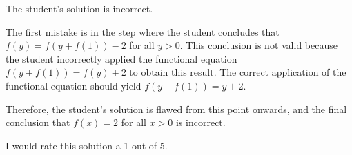 The student's solution is incorrect.

The first mistake is in the step where the student concludes that $f(y) = f(y+f(1))-2$ for all $y>0$. This conclusion is not valid because the student incorrectly applied the functional equation $f(y+f(1)) = f(y) + 2$ to obtain this result. The correct application of the functional equation should yield $f(y+f(1)) = y + 2$.

Therefore, the student's solution is flawed from this point onwards, and the final conclusion that $f(x) = 2$ for all $x>0$ is incorrect.

I would rate this solution a 1 out of 5.
